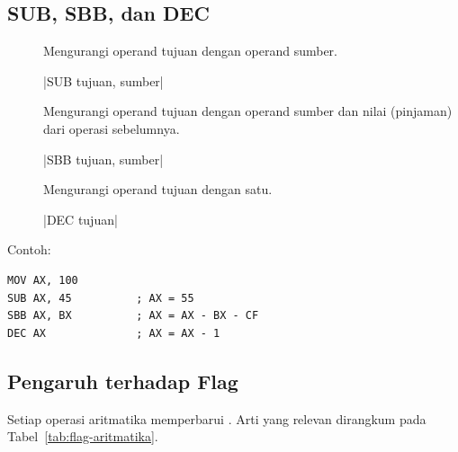 \subsection{SUB, SBB, dan DEC}

\begin{description}
    \item[] Mengurangi operand tujuan dengan operand sumber.
          \begin{center}
          \lstasm|SUB tujuan, sumber|
          \end{center}

    \item[] Mengurangi operand tujuan dengan operand sumber
          dan nilai  (pinjaman) dari operasi sebelumnya.
          \begin{center}
          \lstasm|SBB tujuan, sumber|
          \end{center}

    \item[] Mengurangi operand tujuan dengan satu.
          \begin{center}
          \lstasm|DEC tujuan|
          \end{center}
\end{description}

Contoh:

\begin{lstlisting}[language=MASM, numbers=none]
MOV AX, 100
SUB AX, 45          ; AX = 55
SBB AX, BX          ; AX = AX - BX - CF
DEC AX              ; AX = AX - 1
\end{lstlisting}

\subsection{Pengaruh terhadap Flag}

Setiap operasi aritmatika memperbarui . Arti 
yang relevan dirangkum pada Tabel~\ref{tab:flag-aritmatika}.

